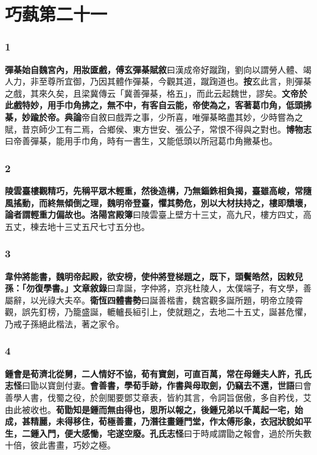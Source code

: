 \chapter{巧蓺第二十一}

\subsection*{1}

\textbf{彈棊始自魏宮內，用妝匳戲，}{\footnotesize \textbf{傅玄彈棊賦敘}曰漢成帝好蹴踘，劉向以謂勞人體、竭人力，非至尊所宜御，乃因其體作彈棊，今觀其道，蹴踘道也。\textbf{按}玄此言，則彈棊之戲，其來久矣，且梁冀傳云「冀善彈棊，格五」，而此云起魏世，謬矣。}\textbf{文帝於此戲特妙，用手巾角拂之，無不中，有客自云能，帝使為之，客著葛巾角，低頭拂棊，妙踰於帝。}{\footnotesize \textbf{典論}帝自敘曰戲弄之事，少所喜，唯彈棊略盡其妙，少時嘗為之賦，昔京師少工有二焉，合鄉侯、東方世安、張公子，常恨不得與之對也。\textbf{博物志}曰帝善彈棊，能用手巾角，時有一書生，又能低頭以所冠葛巾角撇棊也。}

\subsection*{2}

\textbf{陵雲臺樓觀精巧，先稱平眾木輕重，然後造構，乃無錙銖相負揭，臺雖高峻，常隨風搖動，而終無傾倒之理，魏明帝登臺，懼其勢危，別以大材扶持之，樓即穨壞，論者謂輕重力偏故也。}{\footnotesize \textbf{洛陽宮殿簿}曰陵雲臺上壁方十三丈，高九尺，樓方四丈，高五丈，棟去地十三丈五尺七寸五分也。}

\subsection*{3}

\textbf{韋仲將能書，魏明帝起殿，欲安榜，使仲將登梯題之，既下，頭鬢皓然，因敕兒孫：「勿復學書。」}{\footnotesize \textbf{文章敘錄}曰韋誕，字仲將，京兆杜陵人，太僕端子，有文學，善屬辭，以光祿大夫卒。\textbf{衛恆四體書勢}曰誕善楷書，魏宮觀多誕所題，明帝立陵霄觀，誤先釘榜，乃籠盛誕，轆轤長絙引上，使就題之，去地二十五丈，誕甚危懼，乃戒子孫絕此楷法，著之家令。}

\subsection*{4}

\textbf{鍾會是荀濟北從舅，二人情好不協，荀有寶劍，可直百萬，常在母鍾夫人許，}{\footnotesize \textbf{孔氏志怪}曰勖以寶劍付妻。}\textbf{會善書，學荀手跡，作書與母取劍，仍竊去不還，}{\footnotesize \textbf{世語}曰會善學人書，伐蜀之役，於劍閣要鄧艾章表，皆約其言，令詞旨倨傲，多自矜伐，艾由此被收也。}\textbf{荀勖知是鍾而無由得也，思所以報之，後鍾兄弟以千萬起一宅，始成，甚精麗，未得移住，荀極善畫，乃潛往畫鍾門堂，作太傅形象，衣冠狀貌如平生，二鍾入門，便大感慟，宅遂空廢。}{\footnotesize \textbf{孔氏志怪}曰于時咸謂勖之報會，過於所失數十倍，彼此書畫，巧妙之極。}

